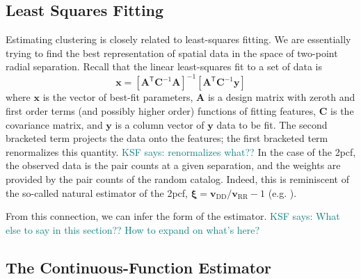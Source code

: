 \documentclass[modern]{aastex62}
\newcommand{\cf}{2pcf\xspace} %
\newcommand{\Est}{The Continuous-Function Estimator\xspace}
\newcommand{\inv}{^{-1}}
\newcommand{\T}{^{\mathsf{T}}}
\newcommand{\bld}[1]{\bm{#1}} %
\newcommand{\vv}[1]{\bld{v}_\mathrm{#1}}
\newcommand{\KSF}[1]{\textcolor{teal}{KSF says: #1}}
\begin{document}
\subsection{Least Squares Fitting}

Estimating clustering is closely related to least-squares fitting.
We are essentially trying to find the best representation of spatial data in the space of two-point radial separation.
Recall that the linear least-squares fit to a set of data is
\begin{equation}
\bld{x} = [\bld{A}\T \bld{C}\inv \bld{A}]\inv [\bld{A}\T \bld{C}\inv \bld{y}]
\end{equation}
where $\bld{x}$ is the vector of best-fit parameters, $\bld{A}$ is a design matrix with zeroth and first order terms (and possibly higher order) functions of fitting features, $\bld{C}$ is the covariance matrix, and $\bld{y}$ is a column vector of $\bld{y}$ data to be fit.
The second bracketed term projects the data onto the features; the first bracketed term renormalizes this quantity. \KSF{renormalizes what??}
In the case of the \cf, the observed data is the pair counts at a given separation, and the weights are provided by the pair counts of the random catalog.
Indeed, this is reminiscent of the so-called natural estimator of the \cf, $\bld{\xi} = \vv{DD}/\vv{RR} - 1$ (e.g. \citealt{Kerscher2000}).

From this connection, we can infer the form of the estimator.
\KSF{What else to say in this section?? How to expand on what's here?}

\subsection{\Est}
\label{sec:est}
\end{document}
